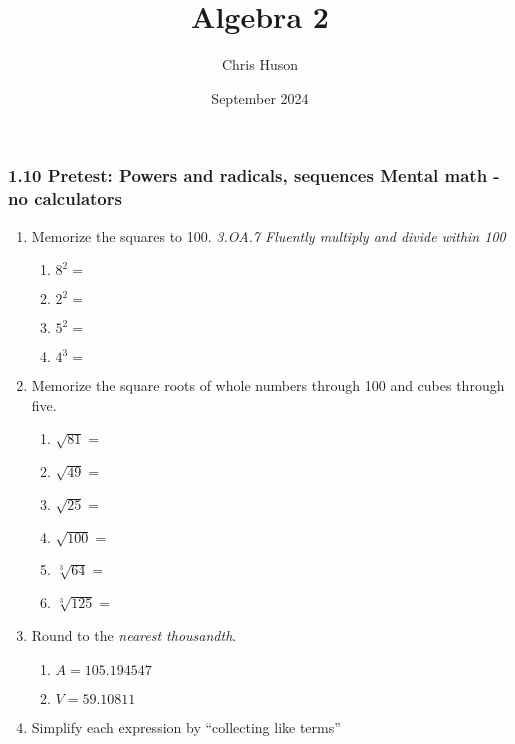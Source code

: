 \documentclass[12pt, twoside]{article}
\title{Algebra 2}
\author{Chris Huson}
\date{September 2024}
\begin{document}
\subsubsection*{1.10 Pretest: Powers and radicals, sequences \hfill Mental math - no calculators}
\begin{enumerate}[itemsep=0.5cm]

\item Memorize the squares to 100. \hfill \emph{3.OA.7 Fluently multiply and divide within 100}
    \begin{multicols}{2}
        \begin{enumerate}[itemsep=0.5cm]
            \item $8^2 =$
            \item $2^2 =$
            \item $5^2 =$
            \item $4^3 =$
        \end{enumerate}
    \end{multicols}

\item Memorize the square roots of whole numbers through 100 and cubes through five.
    \begin{multicols}{2}
        \begin{enumerate}[itemsep=0.5cm]
            \item $\sqrt{81} =$
            \item $\sqrt{49} =$
            \item $\sqrt{25} =$
            \item $\sqrt{100} =$
            \item $\sqrt[3]{64} =$
            \item $\sqrt[3]{125} =$
          \end{enumerate}
    \end{multicols}

\item Round to the \emph{nearest thousandth}.
  \begin{multicols}{2}
  \begin{enumerate}[itemsep=1.5cm]
    \item $A=105.194547$
    \item $V=59.10811$
  \end{enumerate}
  \end{multicols} \vspace{0.5cm}

\item Simplify each expression by ``collecting like terms''
\begin{enumerate}[itemsep=2cm]
  \end{enumerate} \vspace{1cm}


\end{enumerate}
\end{document}
